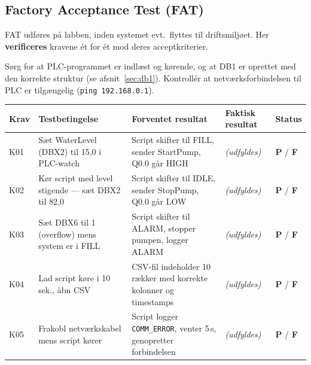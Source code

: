 \documentclass[12pt, a4paper]{article}
\begin{document}
\subsection{Factory Acceptance Test (FAT)}

FAT udføres på labben, inden systemet evt.\ flyttes til driftsmiljøet.
Her \textbf{verificeres} kravene ét for ét mod deres acceptkriterier.

\begin{tcolorbox}[warnbox, title={\faExclamationTriangle\quad Inden testen}]
Sørg for at PLC-programmet er indlæst og kørende, og at DB1 er oprettet med
den korrekte struktur (se afsnit~\ref{sec:db1}).
Kontrollér at netværksforbindelsen til PLC er tilgængelig (\texttt{ping 192.168.0.1}).
\end{tcolorbox}

\vspace{0.4cm}

\begin{tabularx}{\textwidth}{p{1cm} p{2.6cm} p{3.8cm} p{3.8cm} p{1.5cm}}
\toprule
\textbf{Krav} & \textbf{Testbetingelse} & \textbf{Forventet resultat} & \textbf{Faktisk resultat} & \textbf{Status} \\
\midrule
K01 &
  Sæt WaterLevel (DBX2) til 15{,}0 i PLC-watch &
  Script skifter til FILL, sender StartPump, Q0.0 går HIGH &
  \textit{(udfyldes)} &
  \textcolor{passgreen}{\textbf{P}} \;/\; \textcolor{failred}{\textbf{F}} \\[6pt]

K02 &
  Kør script med level stigende --- sæt DBX2 til 82{,}0 &
  Script skifter til IDLE, sender StopPump, Q0.0 går LOW &
  \textit{(udfyldes)} &
  \textcolor{passgreen}{\textbf{P}} \;/\; \textcolor{failred}{\textbf{F}} \\[6pt]

K03 &
  Sæt DBX6 til 1 (overflow) mens system er i FILL &
  Script skifter til ALARM, stopper pumpen, logger ALARM &
  \textit{(udfyldes)} &
  \textcolor{passgreen}{\textbf{P}} \;/\; \textcolor{failred}{\textbf{F}} \\[6pt]

K04 &
  Lad script køre i 10 sek., åbn CSV &
  CSV-fil indeholder 10 rækker med korrekte kolonner og timestamps &
  \textit{(udfyldes)} &
  \textcolor{passgreen}{\textbf{P}} \;/\; \textcolor{failred}{\textbf{F}} \\[6pt]

K05 &
  Frakobl netværkskabel mens script kører &
  Script logger \texttt{COMM\_ERROR}, venter 5\,s, genopretter forbindelsen &
  \textit{(udfyldes)} &
  \textcolor{passgreen}{\textbf{P}} \;/\; \textcolor{failred}{\textbf{F}} \\
\bottomrule
\end{tabularx}
\end{document}
